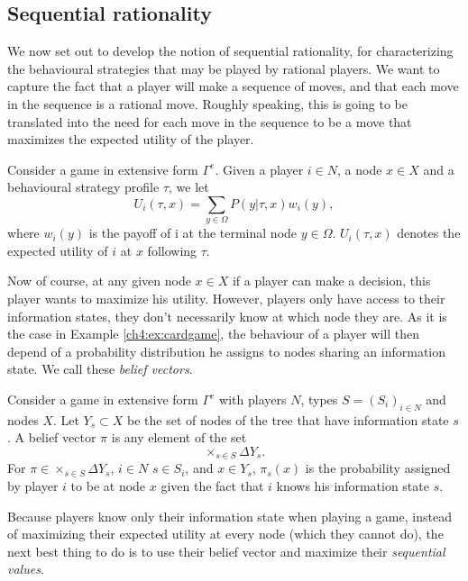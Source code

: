 \subsection{Sequential rationality}

We now set out to develop the notion of sequential rationality, for characterizing the behavioural strategies that may be played by rational players. We want to capture the fact that a player will make a sequence of moves, and that each move in the sequence is a rational move. Roughly speaking, this is going to be translated into the need for each move in the sequence to be a move that maximizes the expected utility of the player.

\begin{definition}
Consider a game in extensive form $\Gamma^e$.
Given a player $i \in N$, a node $x \in X$ and a behavioural strategy profile $\tau$, we let
$$U_i(\tau, x) = \sum_{y \in \Omega} P(y | \tau, x) w_i(y),$$
where $w_i(y)$ is the payoff of i at the terminal node $y \in \Omega$. $U_i(\tau, x)$ denotes the expected utility of $i$ at $x$ following $\tau$.
\end{definition}

Now of course, at any given node $x \in X$ if a player can make a decision, this player wants to maximize his utility. However, players only have access to their information states, they don't necessarily know at which node they are. As it is the case in Example \ref{ch4:ex:cardgame}, the behaviour of a player will then depend of a probability distribution he assigns to nodes sharing an information state. We call these \emph{belief vectors}.

\begin{definition}
Consider a game in extensive form $\Gamma^e$ with players $N$, types $S = (S_i)_{i \in N}$ and nodes $X$. Let $Y_s \subset X$ be the set of nodes of the tree that have information state $s$.
A belief vector $\pi$ is any element of the set
$$ \times_{s \in S} \Delta Y_s.$$
For $\pi \in  \times_{s \in S} \Delta Y_s $, $i \in N$ $s \in S_i$, and $x \in Y_s$, $\pi_s(x)$ is the probability assigned by player $i$ to be at node $x$ given the fact that $i$ knows his information state $s$.
\end{definition}

Because players know only their information state when playing a game, instead of maximizing their expected utility at every node (which they cannot do), the next best thing to do is to use their belief vector and maximize their \emph{sequential values}.

